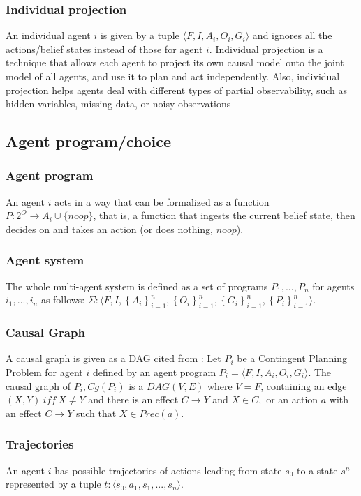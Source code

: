 \subsubsection{Individual projection}
An individual agent $i$ is given by a tuple $\langle F, I, A_i, O_i, G_i \rangle$ and ignores all the actions/belief states instead of those for agent $i$.
Individual projection is a technique that allows each agent to project its own causal model onto the joint model of all agents, and use it to plan and act independently. Also, individual projection helps agents deal with different types of partial observability, such as hidden variables, missing data, or noisy observations \cite{adami_competing_2020, ai_deep_2022}
\subsection{Agent program/choice}
\subsubsection{Agent program}
An agent $i$ acts in a way that can be formalized as a function $P: 2^O \rightarrow A_i \cup \{noop\}$, that is, a function that ingests the current belief state, then decides on and takes an action (or does nothing, $noop$).
\subsubsection{Agent system}
The whole multi-agent system is defined as a set of programs $P_1,...,P_n$ for agents $i_1,...,i_n$ as follows: $\Sigma: \langle F, I, \left\{ A_i \right\}_{i=1}^n, \left\{ O_i \right\}_{i=1}^n, \left\{ G_i \right\}_{i=1}^n, \left\{ P_i \right\}_{i=1}^n \rangle$. 
\subsubsection{Causal Graph}
A causal graph is given as a DAG cited from \cite{Andres2016Oct}:
Let $P_i$ be a Contingent Planning Problem for agent $i$ defined by an agent program $P_i = \langle F, I, A_i, O_i, G_i \rangle$. 
The causal graph of $P_i, Cg(P_i)$ is a $DAG (V, E)$ where $V = F$, containing an edge $(X, Y)\ iff\ X \neq Y$ and there is an effect $C \to Y$ and $X \in C,$ or an action $a$ with an effect $C \to Y$ such that $X \in P rec(a)$.
\subsubsection{Trajectories}
An agent $i$ has possible trajectories of actions leading from state $s_0$ to a state $s^n$ represented by a tuple $t: \langle s_0, a_1, s_1, ..., s_n \rangle$.
